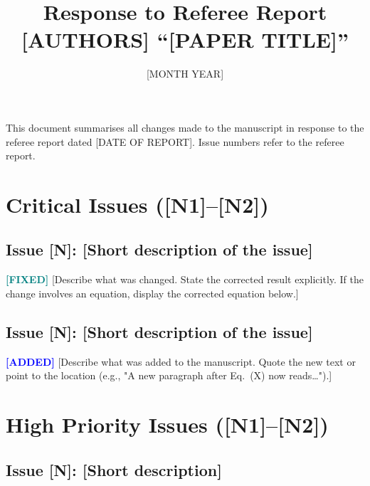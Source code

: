 \documentclass[11pt]{article}
\title{Response to Referee Report\\[6pt]
\large [AUTHORS] ``[PAPER TITLE]''}
\author{}
\date{[MONTH YEAR]}
\newcommand{\fixed}{\textcolor{teal}{\textbf{[FIXED]}}}
\newcommand{\added}{\textcolor{blue}{\textbf{[ADDED]}}}
\newcommand{\noted}{\textcolor{orange}{\textbf{[NOTE]}}}
\begin{document}
\maketitle

\noindent This document summarises all changes made to the manuscript in response
to the referee report dated [DATE OF REPORT]. Issue numbers refer to
the referee report.


\section*{Critical Issues ([N1]--[N2])}

\subsection*{Issue [N]: [Short description of the issue]}

\fixed{} [Describe what was changed. State the corrected result explicitly.
If the change involves an equation, display the corrected equation below.]
\[
\]

\subsection*{Issue [N]: [Short description of the issue]}

\added{} [Describe what was added to the manuscript. Quote the new text
or point to the location (e.g., "A new paragraph after Eq.~(X) now reads…").]

\section*{High Priority Issues ([N1]--[N2])}

\subsection*{Issue [N]: [Short description]}
\end{document}
